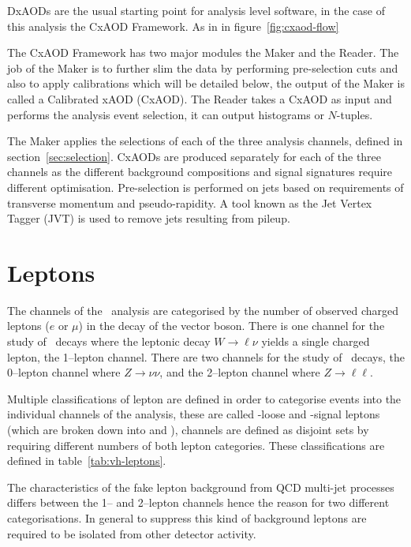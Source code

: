 DxAODs are the usual starting point for analysis level software, in the case of
this analysis the CxAOD Framework. As in in figure~\ref{fig:cxaod-flow}

The CxAOD Framework has two major modules the Maker and the Reader. The job of
the Maker is to further slim the data by performing pre-selection cuts and also
to apply calibrations which will be detailed below, the output of the Maker is
called a Calibrated xAOD (CxAOD). The Reader takes a CxAOD as input and performs
the analysis event selection, it can output histograms or $N$-tuples.

The Maker applies the selections of each of the three analysis channels, defined
in section~\ref{sec:selection}. CxAODs are produced separately for each of the
three channels as the different background compositions and signal signatures
require different optimisation. Pre-selection is performed on jets based on
requirements of transverse momentum and pseudo-rapidity. A tool known as the Jet
Vertex Tagger (JVT) is used to remove jets resulting from pileup.

\section{Leptons}%
\label{sec:lepton}

The channels of the \VHbb\ analysis are categorised by the number of
observed charged leptons ($e$ or $\mu$) in the decay of the vector boson. There
is one channel for the study of \WHbb\ decays where the leptonic
decay $W \rightarrow \ell\nu$ yields a single charged lepton, the 1--lepton
channel. There are two channels for the study of \ZHbb\ decays, the
0--lepton channel where $Z \rightarrow \nu\nu$, and the 2--lepton channel where
$Z \rightarrow \ell\ell$.

Multiple classifications of lepton are defined in order to categorise events into the
individual channels of the analysis, these are called \VH-loose and \VH-signal
leptons (which are broken down into \WH and \ZH), channels are defined as
disjoint sets by requiring different numbers of both lepton categories. These
classifications are defined in table~\ref{tab:vh-leptons}.

The characteristics of the fake lepton background from QCD multi-jet processes
differs between the 1-- and 2--lepton channels hence the reason for two
different categorisations. In general to suppress this kind of background
leptons are required to be isolated from other detector activity.

